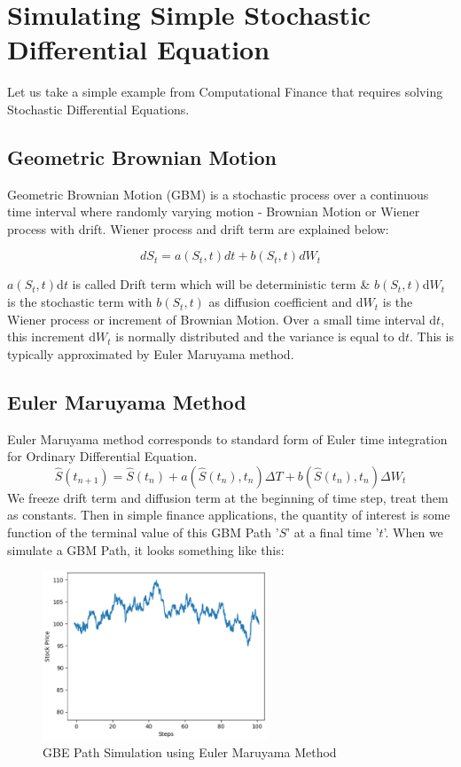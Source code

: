 \documentclass[12pt]{article}
\begin{document}
\section{Simulating Simple Stochastic Differential Equation}
Let us take a simple example from Computational Finance that requires solving Stochastic Differential Equations.
\subsection{Geometric Brownian Motion}
Geometric Brownian Motion (GBM) is a stochastic process over a continuous time interval where randomly varying motion - Brownian Motion or Wiener process with drift. Wiener process and drift term are explained below:

\clearpage
\begin{equation}
   d S_t = a(S_t, t) dt + b(S_t,t) dW_t   
\end{equation}

$a(S_t,t)$d$t$ is called Drift term which will be deterministic term \& $b(S_t,t)$d$W_t$ is the stochastic term with $b(S_t,t)$ as diffusion coefficient and d$W_t$ is the Wiener process or increment of Brownian Motion. Over a small time interval d$t$, this increment d$W_t$ is normally distributed and the variance is equal to d$t$. This is typically approximated by Euler Maruyama method.

\subsection{Euler Maruyama Method}
Euler Maruyama method corresponds to standard form of Euler time integration for Ordinary Differential Equation. 
\begin{equation}
\hat{S}({t}_{n+1}) = \hat{S}({t}_{n}) +a(\hat{S}({t}_{n}),t_n) \Delta T + b(\hat{S}({t}_{n}),t_n) \Delta  W_t 
\end{equation}
We freeze drift term and diffusion term at the beginning of time step, treat them as constants. Then in simple finance applications, the quantity of interest is some function of the terminal value of this GBM Path '$S$' at a final time '$t$'. When we simulate a GBM Path, it looks something like this:

\begin{figure}[h!]
\centering
\includegraphics[width=0.6\textwidth]{GBE_Sim.png}
\caption{GBE Path Simulation using Euler Maruyama Method}
\end{figure}
\end{document}
